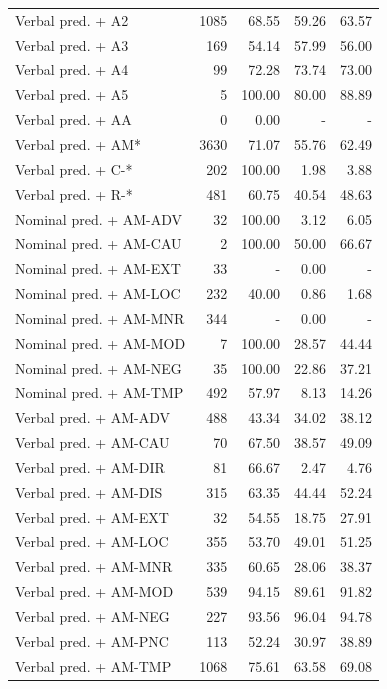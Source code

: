 \documentclass[12pt,notitlepage,a4paper]{report}
\begin{document}
\begin{table}[p]
\begin{center}
\begin{tabular}{|l|r|r|r|r|}
Verbal pred. + A2 & 1085 & 68.55 & 59.26 & 63.57 \\
Verbal pred. + A3 & 169 & 54.14 & 57.99 & 56.00 \\
Verbal pred. + A4 & 99 & 72.28 & 73.74 & 73.00 \\
Verbal pred. + A5 & 5 & 100.00 & 80.00 & 88.89 \\
Verbal pred. + AA & 0 & 0.00 & - & - \\
Verbal pred. + AM* & 3630 & 71.07 & 55.76 & 62.49 \\
Verbal pred. + C-* & 202 & 100.00 & 1.98 & 3.88 \\
Verbal pred. + R-* & 481 & 60.75 & 40.54 & 48.63 \\\hline\hline
Nominal pred. + AM-ADV & 32 & 100.00 & 3.12 & 6.05 \\
Nominal pred. + AM-CAU & 2 & 100.00 & 50.00 & 66.67 \\
Nominal pred. + AM-EXT & 33 & - & 0.00 & - \\
Nominal pred. + AM-LOC & 232 & 40.00 & 0.86 & 1.68 \\
Nominal pred. + AM-MNR & 344 & - & 0.00 & - \\
Nominal pred. + AM-MOD & 7 & 100.00 & 28.57 & 44.44 \\
Nominal pred. + AM-NEG & 35 & 100.00 & 22.86 & 37.21 \\
Nominal pred. + AM-TMP & 492 & 57.97 & 8.13 & 14.26 \\\hline
Verbal pred. + AM-ADV & 488 & 43.34 & 34.02 & 38.12 \\
Verbal pred. + AM-CAU & 70 & 67.50 & 38.57 & 49.09 \\
Verbal pred. + AM-DIR & 81 & 66.67 & 2.47 & 4.76 \\
Verbal pred. + AM-DIS & 315 & 63.35 & 44.44 & 52.24 \\
Verbal pred. + AM-EXT & 32 & 54.55 & 18.75 & 27.91 \\
Verbal pred. + AM-LOC & 355 & 53.70 & 49.01 & 51.25 \\
Verbal pred. + AM-MNR & 335 & 60.65 & 28.06 & 38.37 \\
Verbal pred. + AM-MOD & 539 & 94.15 & 89.61 & 91.82 \\
Verbal pred. + AM-NEG & 227 & 93.56 & 96.04 & 94.78 \\
Verbal pred. + AM-PNC & 113 & 52.24 & 30.97 & 38.89 \\
Verbal pred. + AM-TMP & 1068 & 75.61 & 63.58 & 69.08 \\\hline
\end{tabular}
\end{center}
\end{table}
\end{document}
